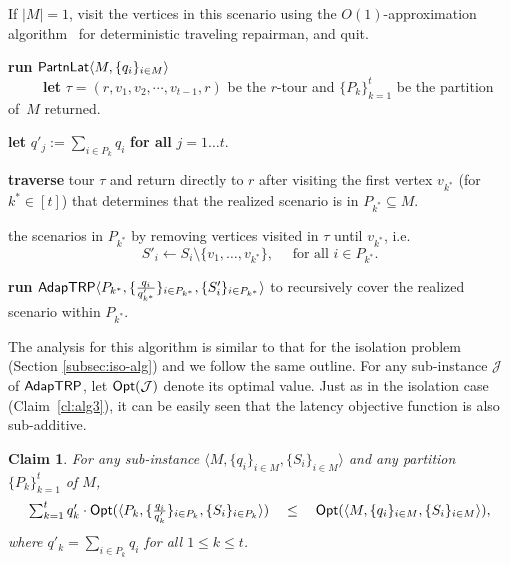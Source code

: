\documentclass[11pt]{article}
\newtheorem{claim}[thm]{Claim}
\def\sse{\subseteq}
\def\opt{{\sf Opt}\xspace}
\def\js{\ensuremath{\mathcal{J}}}
\def\palgl{\ensuremath{{\sf PartnLat}}\xspace}
\def\strp{\ensuremath{{\sf AdapTRP}}\xspace}
\def\ts{\textstyle}
\begin{document}
\begin{algorithm}[!h]
  \caption{$\strp\langle M,\{q_i\}_{i\in M},\{S_i\}_{i\in M} \rangle$}
  \label{alg:trpalg}
  \begin{algorithmic}[1]
    \STATE If $|M|=1$, visit the vertices in this scenario using the $O(1)$-approximation algorithm~\cite{fhr}
    for deterministic traveling repairman, and quit.

    \STATE \label{step:trp2} \textbf{run} $\palgl\langle M,\{q_i\}_{i\in
      M} \rangle$ \\
    ~~~~~\textbf{let} $\tau=(r,v_1,v_2,\cdots,v_{t-1},r)$ be the
    $r$-tour and $\{P_k\}_{k=1}^t$ be the partition of~$M$ returned.

    \STATE \textbf{let} $q'_j:=\sum_{i\in P_k} q_i$ \textbf{for all} $j
    = 1\ldots t$.

    \STATE \label{step:trp3} \textbf{traverse} tour $\tau$ and return
    directly to $r$ after visiting the first vertex $v_{k^*}$
    (for $k^* \in [t]$) that determines that the realized scenario is
    in $P_{k^*} \sse M$.
    
     the scenarios in $P_{k^*}$ by removing vertices visited in $\tau$ until $v_{k^*}$, i.e. $$S'_i\gets S_i\setminus \{v_1,\ldots,v_{k^*}\},\quad  \mbox{ for all }i\in P_{k^*}.$$

    \STATE  \textbf{run} $\strp\langle P_{k^*},
    \{\frac{q_i}{q'_{k^*}}\}_{i\in P_{k^*}},\{S'_i\}_{i\in P_{k^*}}\rangle$ to recursively cover the
    realized scenario within $P_{k^*}$.
  \end{algorithmic}
\end{algorithm}


The analysis for this algorithm is similar to that for the isolation problem (Section \ref{subsec:iso-alg})
and we follow the same outline.  For any sub-instance $\js$ of \strp, let $\opt(\js)$ denote its optimal value.
Just as in the isolation case (Claim~\ref{cl:alg3}), it can be easily seen that the latency objective function is also
sub-additive.
\begin{claim}\label{cl:trp-subadd}
  For any sub-instance $\langle M, \{q_i\}_{i\in M}, \{S_i\}_{i\in M}\rangle$ and any partition  $\{P_k\}_{k=1}^t$ of $M$,
  \begin{gather}
    \ts \sum_{k=1}^t q'_k \cdot \opt(\langle P_k,
    \{\frac{q_i}{q'_k}\}_{i\in P_k}, \{S_i\}_{i\in P_k}\rangle)\quad \le \quad \opt(\langle M,  \{q_i\}_{i\in M}, \{S_i\}_{i\in M}\rangle),
 \end{gather}
  where $q'_k = \sum_{i\in P_k} q_i$ for all $1\le k\le t$.
\end{claim}
\end{document}
